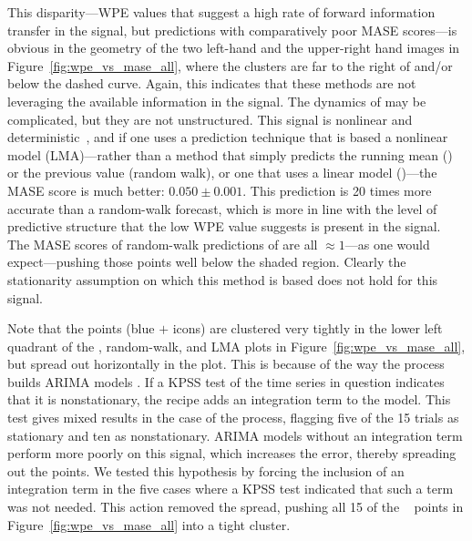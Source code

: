 This disparity---WPE values that suggest a high rate of forward
information transfer in the signal, but predictions with comparatively
poor MASE scores---is obvious in the geometry of the two left-hand
and the upper-right hand images in Figure~\ref{fig:wpe_vs_mase_all}, where the \col clusters
are far to the right of and/or below the dashed curve.  Again, this
indicates that these methods are not leveraging the available
information in the signal.  The dynamics of \col may be complicated,
but they are not unstructured.  This signal is nonlinear and
deterministic~\cite{mytkowicz09}, and if one uses a prediction
technique that is based a nonlinear model (LMA)---rather than a method
that simply predicts the running mean (\naive) or the previous value
(random walk), or one that uses a linear model (\arima)---the MASE
score is much better: $0.050 \pm 0.001$.  This prediction is 20 times
more accurate than a random-walk forecast, which is more in line with
the level of predictive structure that the low WPE value suggests is
present in the signal.  The MASE scores of random-walk predictions of
\col are all $\approx 1$---as one would expect---pushing those points
well below the shaded region.  Clearly the stationarity assumption on
which this method is based does not hold for this signal.

Note that the \col points (blue {\color{blue}$+$} icons) are clustered
very tightly in the lower left quadrant of the \naive, random-walk,
and LMA plots in Figure~\ref{fig:wpe_vs_mase_all}, but spread out
horizontally in the \arima plot.  This is because of the way the
\arima process builds ARIMA models \cite{autoARIMA}.  If a KPSS test
of the time series in question indicates that it is nonstationary, the
\arima recipe adds an integration term to the model.  This test gives
mixed results in the case of the \col process, flagging five of the 15
trials as stationary and ten as nonstationary.  ARIMA models without
an integration term perform more poorly on this signal, which
increases the error, thereby spreading out the points.  We tested this
hypothesis by forcing the inclusion of an integration term in the five
cases where a KPSS test indicated that such a term was not needed.
This action removed the spread, pushing all 15 of the \col ~ \arima
points in Figure~\ref{fig:wpe_vs_mase_all} into a tight cluster.


